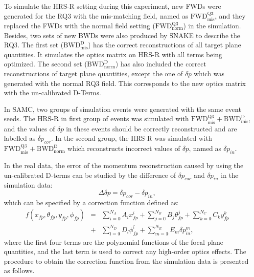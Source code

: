  To simulate the HRS-R setting during this experiment, new FWDs were generated for the RQ3 with the mis-matching field, named as $\mathrm{FWD^{Q3}_{mis}}$, and they replaced the FWDs with the normal field setting ($\mathrm{FWD^{Q3}_{norm}}$) in the simulation. Besides, two sets of new BWDs were also produced by SNAKE to describe the RQ3. The first set ($\mathrm{BWD_{mis}^{D}}$) has the correct reconstructions of all target plane quantities. It simulates the optics matrix on HRS-R with all terms being optimized. The second set ($\mathrm{BWD_{norm}^{D}}$) has also included the correct reconstructions of target plane quantities, except the one of $\delta p$ which was generated with the normal RQ3 field. This corresponds to the new optics matrix with the un-calibrated D-Terms.

 In SAMC, two groups of simulation events were generated with the same event seeds. The HRS-R in first group of events was simulated with $\mathrm{FWD^{Q3}_{mis}+BWD_{mis}^{D}}$, and the values of $\delta p$ in these events should be correctly reconstructed and are labelled as $\delta p_{cor}$. In the second group, the HRS-R was simulated with $\mathrm{FWD^{Q3}_{mis}+BWD_{norm}^{D}}$ which reconstructs incorrect values of $\delta p$, named as $\delta p_{in}$.
  
 In the real data, the error of the momentum reconstruction caused by using the un-calibrated D-terms can be studied by the difference of $\delta p_{cor}$ and $\delta p_{in}$ in the simulation data:
\begin{equation}
 \Delta\delta p = \delta p_{cor} - \delta p_{in},
\end{equation}
which can be specified by a correction function defined as:
\begin{eqnarray}
	 f(x_{fp}, \theta_{fp}, y_{fp}, \phi_{fp}) &=& \sum_{i=0}^{N_{A}}A_{i}x_{fp}^{i}+\sum_{j=0}^{N_{B}}B_{j}\theta_{fp}^{j}+\sum_{k=0}^{N_{C}}C_{k}y_{fp}^{k} \nonumber \\
                                   &+&\sum_{l=0}^{N_{D}}D_{l}\phi_{fp}^{l} +\sum_{m=0}^{N_{E}}E_{m}\delta p_{in}^{m},
\label{dp_corr_func}
\end{eqnarray}
where the first four terms are the polynomial functions of the focal plane quantities, and the last term is used to correct any high-order optics effects. The procedure to obtain the correction function from the simulation data is presented as follows. 

